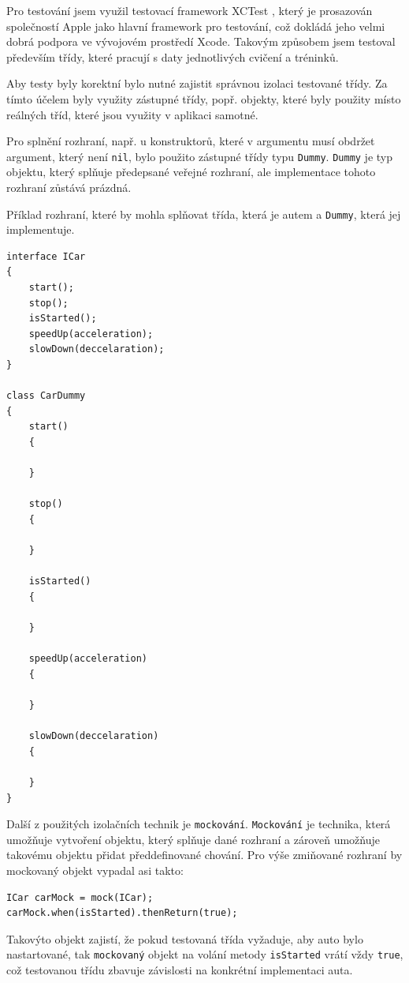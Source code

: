 \documentclass[thesis=B,czech]{FITthesis}[2012/06/26]
\begin{document}
	Pro testování jsem využil testovací framework XCTest \cite{xctestOnline}, který je prosazován společností Apple jako hlavní framework pro testování, což dokládá jeho velmi dobrá podpora ve vývojovém prostředí Xcode. Takovým způsobem jsem testoval především třídy, které pracují s daty jednotlivých cvičení a tréninků.

	Aby testy byly korektní bylo nutné zajistit správnou izolaci testované třídy. Za tímto účelem byly využity zástupné třídy, popř. objekty, které byly použity místo reálných tříd, které jsou využity v aplikaci samotné.

	Pro splnění rozhraní, např. u konstruktorů, které v argumentu musí obdržet argument, který není \verb|nil|, bylo použito zástupné třídy typu \texttt{Dummy}. \texttt{Dummy} je typ objektu, který splňuje předepsané veřejné rozhraní, ale implementace tohoto rozhraní zůstává prázdná.

	Příklad rozhraní, které by mohla splňovat třída, která je autem a \texttt{Dummy}, která jej implementuje.
	\begin{lstlisting}
interface ICar
{
	start();
	stop();
	isStarted();
	speedUp(acceleration);
	slowDown(deccelaration);
}

class CarDummy
{
	start()
	{

	}

	stop()
	{

	}

	isStarted()
	{

	}

	speedUp(acceleration)
	{

	}

	slowDown(deccelaration)
	{

	}
}
	\end{lstlisting}

	Další z použitých izolačních technik je \texttt{mockování}. \texttt{Mockování} je technika, která umožňuje vytvoření objektu, který splňuje dané rozhraní a zároveň umožňuje takovému objektu přidat předdefinované chování. Pro výše zmiňované rozhraní by mockovaný objekt vypadal asi takto:
	\begin{lstlisting}
ICar carMock = mock(ICar);
carMock.when(isStarted).thenReturn(true);
	\end{lstlisting}
	Takovýto objekt zajistí, že pokud testovaná třída vyžaduje, aby auto bylo nastartované, tak \texttt{mockovaný} objekt na volání metody \verb|isStarted| vrátí vždy \verb|true|, což testovanou třídu zbavuje závislosti na konkrétní implementaci auta.
\end{document}
